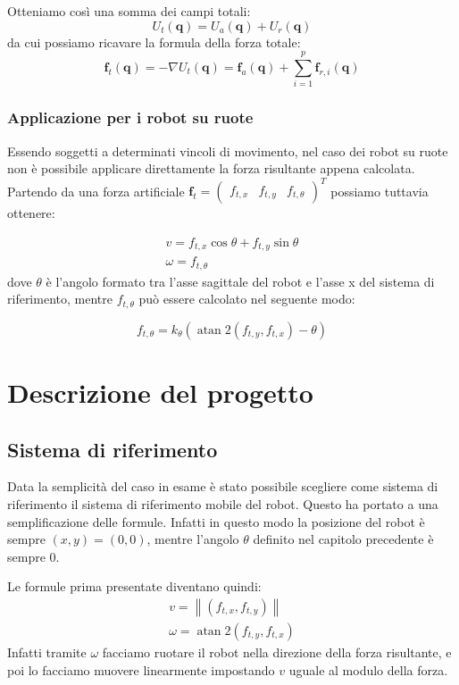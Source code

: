 \documentclass[Lau, binding=0.6cm, oneside]{sapthesis}
\begin{document}
Otteniamo così una somma dei campi totali:
$$
U_{t}(\boldsymbol{q})=U_{a}(\boldsymbol{q})+U_{r}(\boldsymbol{q})
$$
da cui possiamo ricavare la formula della forza totale:
$$
\boldsymbol{f}_{t}(\boldsymbol{q})=-\nabla U_{t}(\boldsymbol{q})=\boldsymbol{f}_{a}(\boldsymbol{q})+\sum_{i=1}^{p} \boldsymbol{f}_{r, i}(\boldsymbol{q})
$$
\cite{fonte2}

\subsection{Applicazione per i robot su ruote}
Essendo soggetti a determinati vincoli di movimento, nel caso dei robot su ruote non è possibile applicare direttamente la forza risultante appena calcolata.
Partendo da una forza artificiale $\boldsymbol{f}_{t}=\left(\begin{array}{lll}f_{t, x} & f_{t, y} & f_{t, \theta}\end{array}\right)^{T}$ possiamo tuttavia ottenere:

$$
\begin{array}{l}
v=f_{t, x} \cos \theta+f_{t, y} \sin \theta \\
\omega=f_{t, \theta}
\end{array}
$$
dove $\theta$ è l'angolo formato tra l'asse sagittale del robot e l'asse x del sistema di riferimento\cite{fonte4}, mentre $f_{t, \theta}$ può essere calcolato nel seguente modo\cite{fonte2}:

$$
f_{t, \theta}=k_{\theta}\left(\operatorname{atan} 2\left(f_{t, y}, f_{t, x}\right)-\theta\right)
$$

\chapter{Descrizione del progetto}
\section{Sistema di riferimento}
Data la semplicità del caso in esame è stato possibile scegliere come sistema di riferimento il sistema di riferimento mobile del robot.
Questo ha portato a una semplificazione delle formule.
Infatti in questo modo la posizione del robot è sempre $\left(x, y\right)=(0,0)$, mentre l'angolo $\theta$ definito nel capitolo precedente è sempre 0.

Le formule prima presentate diventano quindi:
$$
\begin{array}{l}
v=\left\|\left(f_{t, x}, f_{t, y}\right)\right\| \\
\omega=\operatorname{atan} 2\left(f_{t, y}, f_{t, x}\right)
\end{array}
$$
Infatti tramite $\omega$ facciamo ruotare il robot nella direzione della forza risultante, e poi lo facciamo muovere linearmente impostando $v$ uguale al modulo della forza.
\end{document}
